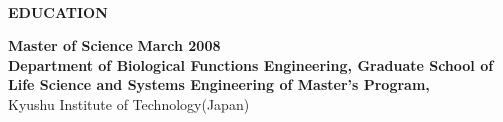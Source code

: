 \begin{center}
    \hrulefill \\
    \begin{large}
        \textbf{EDUCATION} \\
    \end{large} 
\end{center}
\textbf{Master of Science} \hfill \textbf{March 2008}\\
\textbf{Department of Biological Functions Engineering, Graduate School of Life Science and 
Systems Engineering of Master’s Program,} \\
Kyushu Institute of Technology(Japan)